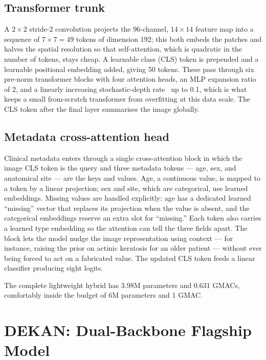 \subsection{Transformer trunk}

A $2\times2$ stride-2 convolution projects the $96$-channel, $14\times14$ feature
map into a sequence of $7\times7 = 49$ tokens of dimension 192; this both embeds
the patches and halves the spatial resolution so that self-attention, which is
quadratic in the number of tokens, stays cheap. A learnable class (CLS) token is
prepended and a learnable positional embedding added, giving 50 tokens. These
pass through six pre-norm transformer blocks with four attention heads, an MLP
expansion ratio of 2, and a linearly increasing stochastic-depth
rate~\cite{huang2016stochasticdepth} up to 0.1, which is what keeps a small
from-scratch transformer from overfitting at this data scale. The CLS token after
the final layer summarises the image globally.

\subsection{Metadata cross-attention head}

Clinical metadata enters through a single cross-attention block in which the
image CLS token is the query and three metadata tokens --- age, sex, and
anatomical site --- are the keys and values. Age, a continuous value, is mapped
to a token by a linear projection; sex and site, which are categorical, use
learned embeddings. Missing values are handled explicitly: age has a dedicated
learned ``missing'' vector that replaces its projection when the value is absent,
and the categorical embeddings reserve an extra slot for ``missing.'' Each token
also carries a learned type embedding so the attention can tell the three fields
apart. The block lets the model nudge the image representation using context ---
for instance, raising the prior on actinic keratosis for an older patient ---
without ever being forced to act on a fabricated value. The updated CLS token
feeds a linear classifier producing eight logits.

The complete lightweight hybrid has 3.98M parameters and 0.631 GMACs, comfortably
inside the budget of 6M parameters and 1 GMAC.

\section{DEKAN: Dual-Backbone Flagship Model}

